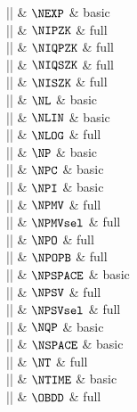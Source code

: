 |\NEXP|    & $\NEXP$ & basic \\

|\NIPZK|    & $\NIPZK$ & full \\

|\NIQPZK|    & $\NIQPZK$ & full \\

|\NIQSZK|    & $\NIQSZK$ & full \\

|\NISZK|    & $\NISZK$ & full \\

|\NL|    & $\NL$ & basic \\

|\NLIN|    & $\NLIN$ & basic \\

|\NLOG|    & $\NLOG$ & full \\

|\NP|    & $\NP$ & basic \\

|\NPC|    & $\NPC$ & basic \\

|\NPI|    & $\NPI$ & basic \\

|\NPMV|    & $\NPMV$ & full \\

|\NPMVsel|    & $\NPMVsel$ & full \\

|\NPO|    & $\NPO$ & full \\

|\NPOPB|    & $\NPOPB$ & full \\

|\NPSPACE|    & $\NPSPACE$ & basic \\

|\NPSV|    & $\NPSV$ & full \\

|\NPSVsel|    & $\NPSVsel$ & full \\

|\NQP|    & $\NQP$ & basic \\

|\NSPACE|    & $\NSPACE$ & basic \\

|\NT|    & $\NT$ & full \\

|\NTIME|    & $\NTIME$ & basic \\

|\OBDD|    & $\OBDD$ & full \\

